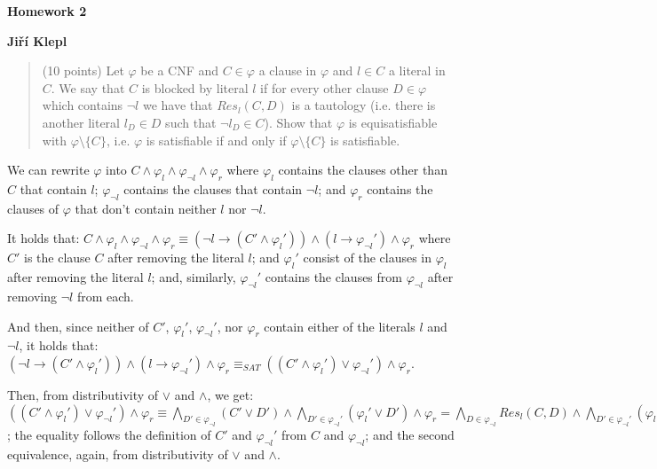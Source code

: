 \documentclass[a4paper,12pt]{article} %
\begin{document}
\begin{center}
    {\Large \bf Homework 2}
    \vspace{2mm}

    {\bf Jiří Klepl}

\end{center}

\vspace{0.4cm}

\begin{quote}
    (10 points) Let $\varphi$ be a CNF and $C \in \varphi$ a clause in $\varphi$ and $l \in C$ a literal in $C$. We say that $C$ is
blocked by literal $l$ if for every other clause $D \in \varphi$ which contains $\neg l$ we have that $Res_l(C, D)$ is a
tautology (i.e. there is another literal $l_D \in D$ such that $\neg l_D \in C$). Show that $\varphi$ is equisatisfiable with
$\varphi \setminus \{C\}$, i.e. $\varphi$ is satisfiable if and only if $\varphi \setminus \{C\}$ is satisfiable.
\end{quote}

We can rewrite $\varphi$ into $C \wedge \varphi_l \wedge \varphi_{\neg l} \wedge \varphi_r$ where $\varphi_{l}$ contains the clauses other than $C$ that contain $l$; $\varphi_{\neg l}$ contains the clauses that contain $\neg l$; and $\varphi_r$ contains the clauses of $\varphi$ that don't contain neither $l$ nor $\neg l$.


It holds that: $C \wedge \varphi_l \wedge \varphi_{\neg l} \wedge \varphi_r \equiv (\neg l \to (C' \wedge \varphi_l')) \wedge (l \to \varphi_{\neg l}') \wedge \varphi_r$ where $C'$ is the clause $C$ after removing the literal $l$; and $\varphi_l'$ consist of the clauses in $\varphi_l$ after removing the literal $l$; and, similarly, $\varphi_{\neg l}'$ contains the clauses from $\varphi_{\neg l}$ after removing $\neg l$ from each.

And then, since neither of $C'$, $\varphi_l'$, $\varphi_{\neg l}'$, nor $\varphi_r$ contain either of the literals $l$ and $\neg l$, it holds that: $(\neg l \to (C' \wedge \varphi_l')) \wedge (l \to \varphi_{\neg l}') \wedge \varphi_r \equiv_{SAT} ((C' \wedge \varphi_l') \vee \varphi_{\neg l}') \wedge \varphi_r$.

Then, from distributivity of $\vee$ and $\wedge$, we get: $((C' \wedge \varphi_l') \vee \varphi_{\neg l}') \wedge \varphi_r \equiv \bigwedge_{D' \in \varphi_{\neg l}} (C' \vee D') \wedge \bigwedge_{D' \in \varphi_{\neg l}'}(\varphi_l' \vee D') \wedge \varphi_r = \bigwedge_{D \in \varphi_{\neg l}} Res_l(C, D) \wedge \bigwedge_{D' \in \varphi_{\neg l}'}(\varphi_l' \vee D') \wedge \varphi_r \equiv \bigwedge_{D \in \varphi_{\neg l}} Res_l(C, D) \wedge (\varphi_l' \vee \varphi_{\neg l}') \wedge \varphi_r$; the equality follows the definition of $C'$ and $\varphi_{\neg l}'$ from $C$ and $\varphi_{\neg l}$; and the second  equivalence, again, from distributivity of $\vee$ and $\wedge$.
\end{document}
